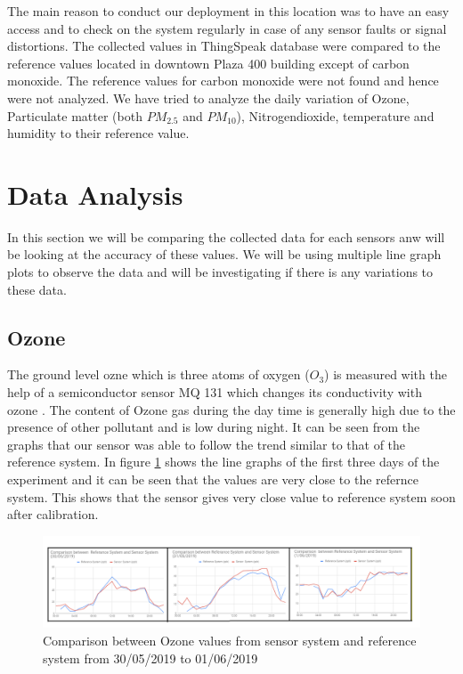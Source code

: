   The main reason to conduct our deployment in this location was to have an easy access and to check on the system regularly in case of any sensor faults or signal distortions. The collected values in ThingSpeak database were compared to the reference values located in downtown Plaza 400 building except of carbon monoxide. The reference values for carbon monoxide were not found and hence were not analyzed. We have tried to analyze the daily variation of  Ozone, Particulate matter (both $PM_{2.5}$ and $PM_{10}$), Nitrogendioxide, temperature and humidity to their reference value.

  \section{Data Analysis}
  In this section we will be comparing the collected data for each sensors anw will be looking at the accuracy of these values. We will be using multiple line graph plots to observe the data and will be investigating if there is any variations to these data.
  \subsection{Ozone}

  The ground level ozne which is three atoms of oxygen ($O_3$) is measured with the help of a semiconductor sensor MQ 131 which changes its conductivity with ozone \cite{technicalsheetozone}. The content of Ozone gas during the day time is generally high due to the presence of other pollutant and is low during night. It can be seen from the graphs that our sensor was able to follow the trend similar to that of the reference system. In figure \ref{Ozone} shows the line graphs of the first three days of the experiment and it can be seen that the values are very close to the refernce system. This shows that the sensor gives very close value to reference system soon after calibration.


  
\begin{figure}[h]
    \begin{center}
    \includegraphics[scale=0.70]{images/figure21.png}
    \end{center}
    \caption{Comparison between Ozone values from sensor system and reference system from 30/05/2019 to 01/06/2019}
    \label{Ozone}

  \end{figure}
  \bigskip

